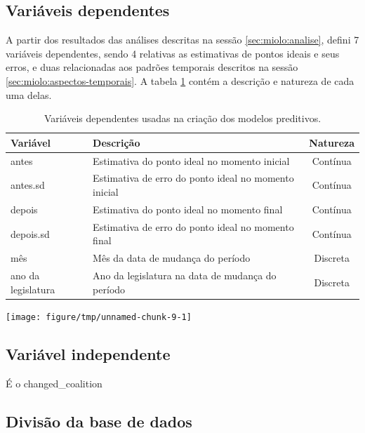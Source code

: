 \documentclass[a4paper,titlepage]{ppgi}\usepackage[]{graphicx}\usepackage[]{color}
\newenvironment{knitrout}{}{} %
\begin{document}
\subsection{Variáveis dependentes}
\label{sec:miolo:variaveis-dependentes}

A partir dos resultados das análises descritas na sessão
\ref{sec:miolo:analise}, defini 7 variáveis dependentes, sendo 4 relativas
as estimativas de pontos ideais e seus erros, e duas relacionadas aos padrões
temporais descritos na sessão \ref{sec:miolo:aspectos-temporais}. A tabela
\ref{table:variaveis-dependentes} contém a descrição e natureza de cada uma
delas.

\begin{table}
\centering
\begin{tabular}{l l c}
  Variável & Descrição & Natureza \\
  \hline
  antes & Estimativa do ponto ideal no momento inicial & Contínua \\
  antes.sd & Estimativa de erro do ponto ideal no momento inicial& Contínua \\
  depois & Estimativa do ponto ideal no momento final & Contínua \\
  depois.sd & Estimativa de erro do ponto ideal no momento final & Contínua \\
  mês & Mês da data de mudança do período & Discreta \\
  ano da legislatura & Ano da legislatura na data de mudança do período & Discreta \\
\end{tabular}
\caption{Variáveis dependentes usadas na criação dos modelos preditivos.}
\label{table:variaveis-dependentes}
\end{table}

\begin{knitrout}
\color{fgcolor}
\texttt{[image: figure/tmp/unnamed-chunk-9-1]} 

\end{knitrout}

\subsection{Variável independente}

É o changed\_coalition

\subsection{Divisão da base de dados}
\end{document}
